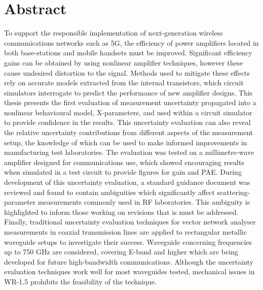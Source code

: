 \documentclass[../thesis/thesis.tex]{subfiles}
\begin{document}
\chapter*{Abstract}
\renewcommand{\baselinestretch}{1.5}\selectfont
To support the responsible implementation of next-generation wireless communications networks such as 5G, the efficiency of power amplifiers located in both base-stations and mobile handsets must be improved. Significant efficiency gains can be obtained by using nonlinear amplifier techniques, however these cause undesired distortion to the signal. Methods used to mitigate these effects rely on accurate models extracted from the internal transistors, which circuit simulators interrogate to predict the performance of new amplifier designs. This thesis presents the first evaluation of measurement uncertainty propagated into a nonlinear behavioural model, X-parameters, and used within a circuit simulator to provide confidence in the results. This uncertainty evaluation can also reveal the relative uncertainty contributions from different aspects of the measurement setup, the knowledge of which can be used to make informed improvements in manufacturing test laboratories. The evaluation was tested on a millimetre-wave amplifier designed for communications use, which showed encouraging results when simulated in a test circuit to provide figures for gain and PAE. During development of this uncertainty evaluation, a standard guidance document was reviewed and found to contain ambiguities which significantly affect scattering-parameter measurements commonly used in RF laboratories. This ambiguity is highlighted to inform those working on revisions that is must be addressed. Finally, traditional uncertainty evaluation techniques for vector network analyser measurements in coaxial transmission lines are applied to rectangular metallic waveguide setups to investigate their success. Waveguide concerning frequencies up to 750 GHz are considered, covering E-band and higher which are being developed for future high-bandwidth communications. Although the uncertainty evaluation techniques work well for most waveguides tested, mechanical issues in WR-1.5 prohibits the feasibility of the technique.

\renewcommand{\baselinestretch}{1}\selectfont
\end{document}
